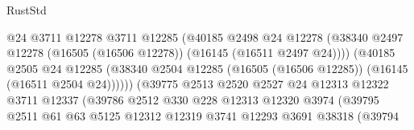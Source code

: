 \begin{lexlean}{RustStd}
\begin{coremodule}
                                          @24
                                          @3711
                                          @12278
                                          @3711
                                          @12285
                                          (@40185
                                            @2498
                                            @24
                                            @12278
                                            (@38340
                                              @2497
                                              @12278
                                              (@16505 (@16506 @12278))
                                              (@16145 (@16511 @2497 @24))))
                                          (@40185
                                            @2505
                                            @24
                                            @12285
                                            (@38340
                                              @2504
                                              @12285
                                              (@16505 (@16506 @12285))
                                              (@16145 (@16511 @2504 @24))))))
                                      (@39775
                                        @2513
                                        @2520
                                        @2527
                                        @24
                                        @12313
                                        @12322
                                        @3711
                                        @12337
                                        (@39786
                                          @2512
                                          @330
                                          @228
                                          @12313
                                          @12320
                                          @3974
                                          (@39795
                                            @2511
                                            @61
                                            @63
                                            @5125
                                            @12312
                                            @12319
                                            @3741
                                            @12293
                                            @3691
                                            @38318
                                            (@39794

\end{coremodule}
\end{lexlean}

